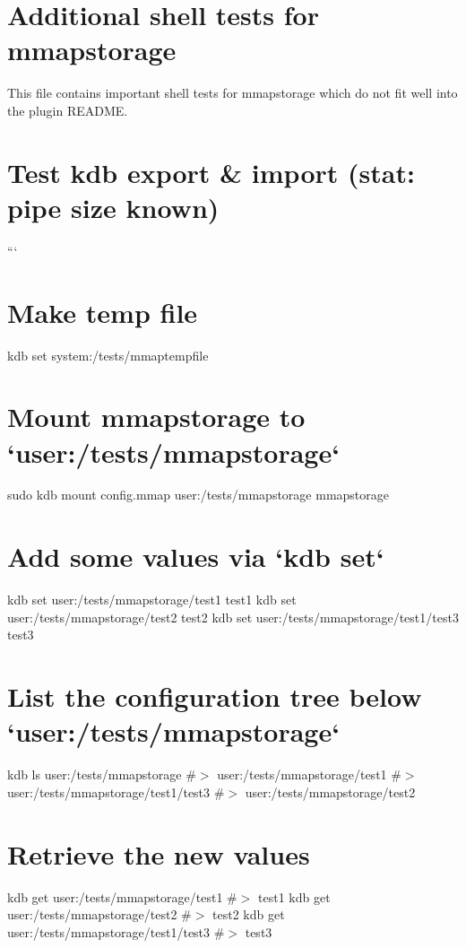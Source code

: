 \hypertarget{autotoc_md411_src_plugins_mmapstorage_shelltests_md}{}\section{Additional shell tests for mmapstorage}\label{autotoc_md411_src_plugins_mmapstorage_shelltests_md}
This file contains important shell tests for mmapstorage which do not fit well into the plugin R\+E\+A\+D\+ME.\hypertarget{autotoc_md411_autotoc_md412}{}\section{Test kdb export \& import (stat\+: pipe size known)}\label{autotoc_md411_autotoc_md412}
``` \hypertarget{autotoc_md411_autotoc_md413}{}\section{Make temp file}\label{autotoc_md411_autotoc_md413}
kdb set system\+:/tests/mmaptempfile \hypertarget{autotoc_md411_autotoc_md414}{}\section{Mount mmapstorage to `user\+:/tests/mmapstorage`}\label{autotoc_md411_autotoc_md414}
sudo kdb mount config.\+mmap user\+:/tests/mmapstorage mmapstorage\hypertarget{autotoc_md411_autotoc_md415}{}\section{Add some values via `kdb set`}\label{autotoc_md411_autotoc_md415}
kdb set user\+:/tests/mmapstorage/test1 test1 kdb set user\+:/tests/mmapstorage/test2 test2 kdb set user\+:/tests/mmapstorage/test1/test3 test3\hypertarget{autotoc_md411_autotoc_md416}{}\section{List the configuration tree below `user\+:/tests/mmapstorage`}\label{autotoc_md411_autotoc_md416}
kdb ls user\+:/tests/mmapstorage \#$>$ user\+:/tests/mmapstorage/test1 \#$>$ user\+:/tests/mmapstorage/test1/test3 \#$>$ user\+:/tests/mmapstorage/test2\hypertarget{autotoc_md411_autotoc_md417}{}\section{Retrieve the new values}\label{autotoc_md411_autotoc_md417}
kdb get user\+:/tests/mmapstorage/test1 \#$>$ test1 kdb get user\+:/tests/mmapstorage/test2 \#$>$ test2 kdb get user\+:/tests/mmapstorage/test1/test3 \#$>$ test3

